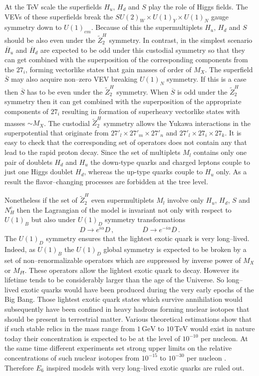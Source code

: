 \documentclass[12pt,a4paper]{article}
\newcommand{\be}{\begin{equation}}
\newcommand{\ee}{\end{equation}}
\begin{document}
At the TeV scale the superfields $H_u$, $H_d$ and $S$ play the role of
Higgs fields. The VEVs of these superfields break the $SU(2)_W\times
U(1)_Y\times U(1)_{N}$ gauge symmetry down to $U(1)_{em}$.  Because of
this the supermultiplets $H_u$, $H_d$ and $S$ should be also even
under the $\tilde{Z}^{H}_2$ symmetry.  In contrast, in the simplest
scenario $\overline{H}_u$ and $\overline{H}_d$ are expected to be odd
under this custodial symmetry so that they can get combined with the
superposition of the corresponding components from the $27_i$, forming
vectorlike states that gain masses of order of $M_X$.  The superfield
$\overline{S}$ may also acquire non--zero VEV breaking $U(1)_{N}$
symmetry. If this is a case then $\overline{S}$ has to be even under
the $\tilde{Z}^{H}_2$ symmetry. When $\overline{S}$ is odd under the
$\tilde{Z}^{H}_2$ symmetry then it can get combined with the
superposition of the appropriate components of $27_i$ resulting in
formation of superheavy vectorlike states with masses $\sim M_X$.  The
custodial $\tilde{Z}^{H}_2$ symmetry allows the Yukawa interactions in
the superpotential that originate from $27'_l \times 27'_m \times
27'_n$ and $27'_l \times 27_i \times 27_k$. It is easy to check that
the corresponding set of operators does not contain any that lead to
the rapid proton decay. Since the set of multiplets $M_{l}$ contains
only one pair of doublets $H_d$ and $H_u$ the down-type quarks and
charged leptons couple to just one Higgs doublet $H_d$, whereas the
up-type quarks couple to $H_u$ only. As a result the flavor--changing
processes are forbidden at the tree level.

Nonetheless if the set of $\tilde{Z}^{H}_2$ even supermultiplets
$M_{l}$ involve only $H_u$, $H_d$, $S$ and $N^c_H$ then the Lagrangian
of the model is invariant not only with respect to $U(1)_B$ but also
under $U(1)_D$ symmetry transformations \be D\to e^{i\alpha}
D\,,\qquad\qquad \overline{D}\to e^{-i\alpha}\overline{D}\,.
\label{hd6}
\ee
The $U(1)_D$ symmetry ensures that the lightest exotic quark is very long--lived.
Indeed, as $U(1)_B$ the $U(1)_D$ global symmetry is expected to be broken by a set of non--renormalizable
operators which are suppressed by inverse power of $M_X$ or $M_{Pl}$. These operators allow the lightest
exotic quark to decay. However its lifetime tends to be considerably larger than the age of the Universe.
So long--lived exotic quarks would have been produced during the very early epochs of the Big Bang.
Those lightest exotic quark states which survive annihilation would subsequently have been confined
in heavy hadrons forming nuclear isotopes that should be present in terrestrial matter. Various theoretical
estimations \cite{43} show that if such stable relics in the mass range from $1\,\mbox{GeV}$ to $10\,\mbox{TeV}$
would exist in nature today their concentration is expected to be at the level of $10^{-10}$ per nucleon.
At the same time different experiments set strong upper limits on the relative concentrations of such
nuclear isotopes from $10^{-15}$ to $10^{-30}$ per nucleon \cite{42}. Therefore $E_6$ inspired models
with very long--lived exotic quarks are ruled out.
\end{document}
